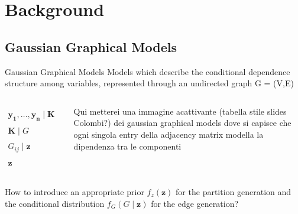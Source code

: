 

\section{Background}

\subsection{Gaussian Graphical Models}
\begin{frame}{Gaussian Graphical Models}
    Models which describe the \alert{conditional dependence structure} among variables, represented through an undirected graph G = (V,E)
\begin{columns}
\begin{column}{0.5\textwidth}

\newcommand{\iid}{\overset{\mathrm{iid}}{\sim}}
\newcommand{\ind}{\overset{\mathrm{ind}}{\sim}}


\centering
\begin{align*}
    \mathbf{y_{1}}, \ldots, \mathbf{y_{n}} \mid \mathbf{K} &\iid N_\mathbf{{p}}(0,\mathbf{K}), \mathbf{K}=\Sigma^{-1}\\  %
    \mathbf{K} \mid G &\iid G-Wishart(B,d) ,  \mathbf{K} \in \mathbb{R}^{p\times p}\\
    G_{ij} \mid \mathbf{z} &\ind\  f_{G}(G \mid \mathbf{z}) , 1 \le i < j \le p \\
    \mathbf{z} &\iid\ f_{z}(\mathbf{z}), \mathbf{z} \in \mathbb{R}^p
\end{align*}
\end{column}

\begin{column}{0.5\textwidth}
Qui metterei una immagine acattivante (tabella stile slides Colombi?) dei gaussian graphical models dove si capisce che ogni singola entry della adjacency matrix modella la dipendenza tra le componenti
\end{column}

\end{columns}
\centering
How to introduce an appropriate prior $f_{z}(\mathbf{z})$ for the \alert{partition generation} and the conditional distribution $f_{G}(G \mid \mathbf{z})$ for the \alert{edge generation}? 
\end{frame}






